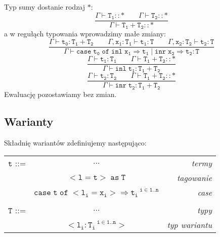 \documentclass[11pt,leqno]{article}
\begin{document}
Typ sumy dostanie rodzaj $\mathtt{\ast}$:
 	\[\mathtt{
             \frac{\Gamma \vdash T_1::\ast \hspace{2em} \Gamma \vdash T_2::\ast}{\Gamma \vdash T_1+T_2::\ast}
		}
	\]
a w regułąch typowania wprowadzimy małe zmiany:
 	\[\mathtt{ \frac{\Gamma \vdash t_0:T_1+T_2 \hspace{2em} \Gamma,x_1:T_1 \vdash t_1:T \hspace{2em} \Gamma,x_2:T_2 \vdash t_2:T}{\Gamma \vdash case\;t_0\;of\;inl\;x_1\Rightarrow t_1\;|\;inr\;x_2\Rightarrow t_2 : T}
		}
	\]
 	\[\mathtt{ \frac{\Gamma \vdash t_1 : T_1 \hspace{2em} \Gamma \vdash T_1+T_2::\ast}{\Gamma \vdash inl\;t_1:T_1+T_2}
		}
	\]
 	\[\mathtt{ \frac{\Gamma \vdash t_2 : T_2 \hspace{2em} \Gamma \vdash T_1+T_2::\ast}{\Gamma \vdash inr\;t_2:T_1+T_2}
		}
	\]
Ewaluację pozostawiamy bez zmian.


\subsection{Warianty}

Składnię wariantów zdefiniujemy następująco:\\

\begin{tabular}{| l c r |}
  \hline
  $\mathtt{t}$ ::= & $\dots$ & \textit{termy}  \\
   & $\mathtt{<l=t>\;as\;T}$ & \textit{tagowanie} \\
   & $\mathtt{case\;t\;of\;<l_i=x_i>\Rightarrow t_i^{\;\;\;i \in 1..n}}$ & \textit{case}\\
   & & \\
  $\mathtt{T}$ ::= & $\dots$ & \textit{typy}  \\
   & $\mathtt{<l_i:T_i^{\;\;\;i \in 1..n}>}$ & \textit{typ wariantu}\\
  \hline
\end{tabular} \\
\end{document}
